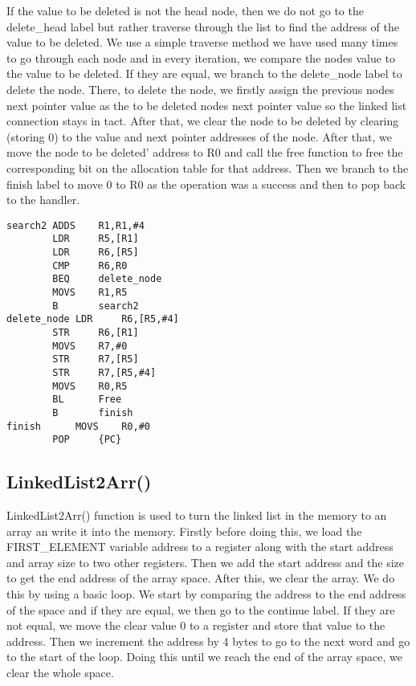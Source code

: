 \documentclass[pdftex,12pt,a4paper]{article}
\begin{document}
If the value to be deleted is not the head node, then we do not go to the delete\_head label but rather traverse through the list to find the address of the value to be deleted. We use a simple traverse method we have used many times to go through each node and in every iteration, we compare the nodes value to the value to be deleted. If they are equal, we branch to the delete\_node label to delete the node. There, to delete the node, we firstly assign the previous nodes next pointer value as the to be deleted nodes next pointer value so the linked list connection stays in tact. After that, we clear the node to be deleted by clearing (storing 0) to the value and next pointer addresses of the node. After that, we move the node to be deleted' address to R0 and call the free function to free the corresponding bit on the allocation table for that address. Then we branch to the finish label to move 0 to R0 as the operation was a success and then to pop back to the handler.

\begin{lstlisting}
search2	ADDS    R1,R1,#4					
		LDR     R5,[R1]					
		LDR     R6,[R5]						
		CMP     R6,R0					
		BEQ     delete_node				
		MOVS    R1,R5						
		B       search2					
delete_node	LDR     R6,[R5,#4]					
		STR     R6,[R1]					
		MOVS    R7,#0					
		STR     R7,[R5]						
		STR     R7,[R5,#4]									
		MOVS    R0,R5					
		BL      Free						
		B       finish
finish 		MOVS    R0,#0						
		POP     {PC}
\end{lstlisting}



\subsection{LinkedList2Arr()}

LinkedList2Arr() function is used to turn the linked list in the memory to an array an write it into the memory. Firstly before doing this, we load the FIRST\_ELEMENT variable address to a register along with the start address and array size to two other registers. Then we add the start address and the size to get the end address of the array space. After this, we clear the array. We do this by using a basic loop. We start by comparing the address to the end address of the space and if they are equal, we then go to the continue label. If they are not equal, we move the clear value 0 to a register and store that value to the address. Then we increment the address by 4 bytes to go to the next word and go to the start of the loop. Doing this until we reach the end of the array space, we clear the whole space.
\end{document}

